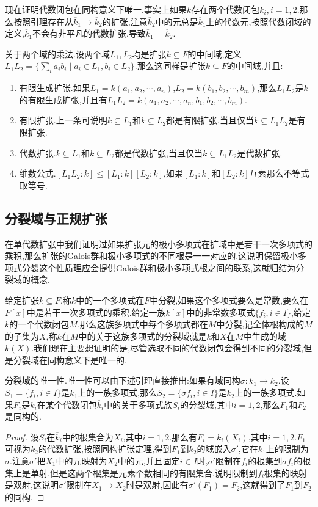 现在证明代数闭包在同构意义下唯一.事实上如果$k$存在两个代数闭包$\overline{k}_i,i=1,2$.那么按照引理存在从$\overline{k}_1\to\overline{k}_2$的扩张,注意$\overline{k}_2$中的元总是$\overline{k}_1$上的代数元,按照代数闭域的定义,$\overline{k}_1$不会有非平凡的代数扩张,导致$\overline{k}_1=\overline{k}_2$.

关于两个域的乘法.设两个域$L_1,L_2$均是扩张$k\subseteq F$的中间域,定义$L_1L_2=\{\sum_ia_ib_i\mid a_i\in L_1,b_i\in L_2\}$.那么这同样是扩张$k\subseteq F$的中间域,并且:
\begin{enumerate}
	\item 有限生成扩张.如果$L_1=k(a_1,a_2,\cdots,a_n)$,$L_2=k(b_1,b_2,\cdots,b_m)$,那么$L_1L_2$是$k$的有限生成扩张,并且有$L_1L_2=k(a_1,a_2,\cdots,a_n,b_1,b_2,\cdots,b_m)$.
	\item 有限扩张.上一条可说明$k\subseteq L_1$和$k\subseteq L_2$都是有限扩张,当且仅当$k\subseteq L_1L_2$是有限扩张.
	\item 代数扩张.$k\subseteq L_1$和$k\subseteq L_2$都是代数扩张,当且仅当$k\subseteq L_1L_2$是代数扩张.
	\item 维数公式.$[L_1L_2:k]\le[L_1:k][L_2:k]$,如果$[L_1:k]$和$[L_2:k]$互素那么不等式取等号.
\end{enumerate}
\newpage
\subsection{分裂域与正规扩张}

在单代数扩张中我们证明过如果扩张元的极小多项式在扩域中是若干一次多项式的乘积,那么扩张的Galois群和极小多项式的不同根是一一对应的.这说明保留极小多项式分裂这个性质理应会提供Galois群和极小多项式根之间的联系,这就归结为分裂域的概念.

给定扩张$k\subseteq F$,称$k$中的一个多项式在$F$中分裂,如果这个多项式要么是常数,要么在$F[x]$中是若干一次多项式的乘积.给定一族$k[x]$中的非常数多项式$\{f_i,i\in I\}$,给定$k$的一个代数闭包$M$,那么这族多项式中每个多项式都在$M$中分裂,记全体根构成的$M$的子集为$X$,称$k$在$M$中的关于这族多项式的分裂域就是$k$和$X$在$M$中生成的域$k(X)$.我们现在主要想证明的是,尽管选取不同的代数闭包会得到不同的分裂域,但是分裂域在同构意义下是唯一的.

分裂域的唯一性.唯一性可以由下述引理直接推出:如果有域同构$\sigma:k_1\to k_2$.设$S_1=\{f_i,i\in I\}$是$k_1$上的一族多项式,那么$S_2=\{\sigma f_i,i\in I\}$是$k_2$上的一族多项式.如果$F_i$是$k_i$在某个代数闭包$\overline{k}_i$中的关于多项式族$S_i$的分裂域,其中$i=1,2$,那么$F_1$和$F_2$是同构的.
\begin{proof}
	
	设$S_i$在$\overline{k}_i$中的根集合为$X_i$,其中$i=1,2$.那么有$F_i=k_i(X_i)$,其中$i=1,2$.$F_1$可视为$k_2$的代数扩张,按照同构扩张定理,得到$F_1$到$\overline{k}_2$的域嵌入$\sigma'$,它在$k_1$上的限制为$\sigma$.注意$\sigma'$把$X_1$中的元映射为$X_2$中的元,并且固定$i\in I$时,$\sigma'$限制在$f_i$的根集到$\sigma f_i$的根集上是单射,但是这两个根集是元素个数相同的有限集合,说明限制到$f_i$根集的映射是双射,这说明$\sigma'$限制在$X_1\to X_2$时是双射,因此有$\sigma'(F_1)=F_2$,这就得到了$F_1$到$F_2$的同构.
\end{proof}

